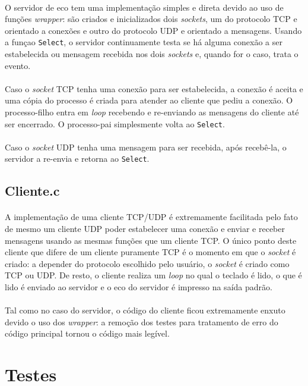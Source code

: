 \documentclass[a4paper,10pt,oneside,final,titlepage,onecolumn]{article}
\begin{document}
\paragraph{}O servidor de eco tem uma implementação simples e direta devido ao uso de funções \emph{wrapper}: são criados e inicializados dois \emph{sockets}, um do protocolo TCP e orientado a conexões e outro do protocolo UDP e orientado a mensagens. Usando a funçao \verb|Select|, o servidor continuamente testa se há alguma conexão a ser estabelecida ou mensagem recebida nos dois \emph{sockets} e, quando for o caso, trata o evento.
\paragraph{}Caso o \emph{socket} TCP tenha uma conexão para ser estabelecida, a conexão é aceita e uma cópia do processo é criada para atender ao cliente que pediu a conexão. O processo-filho entra em \emph{loop} recebendo e re-enviando as mensagens do cliente até ser encerrado. O processo-pai simplesmente volta ao \verb|Select|.
\paragraph{}Caso o \emph{socket} UDP tenha uma mensagem para ser recebida, após recebê-la, o servidor a re-envia e retorna ao \verb|Select|.
\subsection{Cliente.c}
\paragraph{}A implementação de uma cliente TCP/UDP é extremamente facilitada pelo fato de mesmo um cliente UDP poder estabelecer uma conexão e enviar e receber mensagens usando as mesmas funções que um cliente TCP. O único ponto deste cliente que difere de um cliente puramente TCP é o momento em que o \emph{socket} é criado: a depender do protocolo escolhido pelo usuário, o \emph{socket} é criado como TCP ou UDP. De resto, o cliente realiza um \emph{loop} no qual o teclado é lido, o que é lido é enviado ao servidor e o eco do servidor é impresso na saída padrão.
\paragraph{}Tal como no caso do servidor, o código do cliente ficou extremamente enxuto devido o uso dos \emph{wrapper}: a remoção dos testes para tratamento de erro do código principal tornou o código mais legível.



\FloatBarrier
\section{Testes}
\paragraph{}
\end{document}
